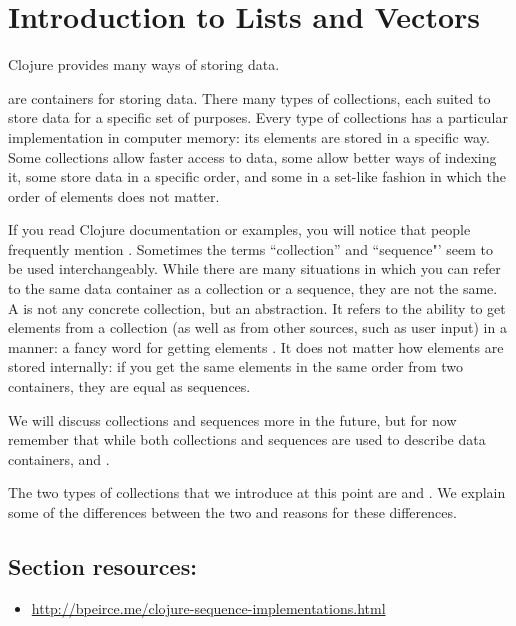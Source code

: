 \section{Introduction to Lists and Vectors}\label{sec:list-vectors}
Clojure provides many ways of storing data. 

  are containers for storing data. There many types of collections, each suited to store data for a specific set of purposes. Every type of collections has a particular implementation in computer memory: its elements are stored in a specific way. Some collections allow faster access to data, some allow better ways of indexing it, some store data in a specific order, and some in a set-like fashion in which the order of elements does not matter. 

If you read Clojure documentation or examples, you will notice that people frequently mention . Sometimes the terms ``collection'' and ``sequence"' seem to be used interchangeably. While there are many situations in which you can refer to the same data container as a collection or a sequence, they are not the same. A  is not any concrete collection, but an abstraction. It refers to the ability to get elements from a collection (as well as from other sources, such as user input) in a  manner: a fancy word for getting elements . It does not matter how elements are stored internally: if you get the same elements in the same order from two containers, they are equal as sequences.

We will discuss collections and sequences more in the future, but for now remember that while both collections and sequences are used to describe data containers,  and . 

The two types of collections that we introduce at this point are  and . We explain some of the differences between the two and reasons for these differences. 


\subsection{Section resources:}
\begin{itemize}
\item \url{http://bpeirce.me/clojure-sequence-implementations.html}
\end{itemize}

